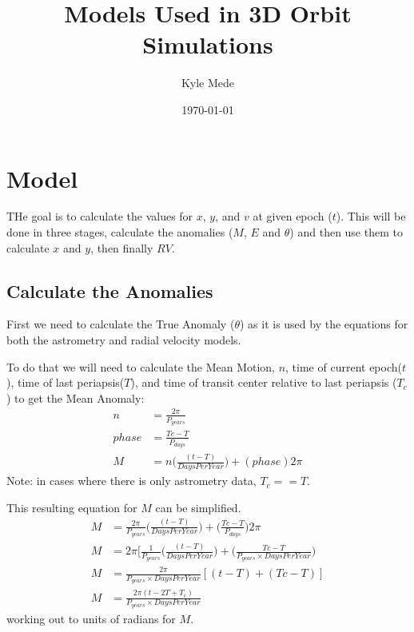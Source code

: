 \documentclass[10pt,preprint]{aastex}
\title{Models Used in 3D Orbit Simulations}
\author{Kyle Mede}
\date{\today}
\begin{document}
\maketitle

\section{Model}
THe goal is to calculate the values for $x$, $y$, and $v$ at given epoch ($t$).  This will be done in three stages, calculate the anomalies ($M$, $E$ and $\theta$) and then use them to calculate $x$ and $y$, then finally $RV$.


\subsection{Calculate the Anomalies}

First we need to calculate the True Anomaly ($\theta$) as it is used by the equations for both the astrometry and radial velocity models.

To do that we will need to calculate the Mean Motion, $n$, time of current epoch($t$), time of last periapsis($T$), and time of transit center relative to last periapsis ($T_c$) to get the Mean Anomaly:
\begin{subequations}\label{eq:n-phase-M}
\begin{align}
\label{eq:n}
n& = \frac{2\pi}{P_{years}} \\
\label{eq:phase}
phase& = \frac{Tc-T}{P_{days}} \\
\label{eq:Ma}
M& = n \bigg( \frac{(t-T)}{DaysPerYear} \bigg)+(phase)2\pi
\end{align}
\end{subequations}
Note: in cases where there is only astrometry data, $T_c==T$.

This resulting equation for $M$ can be simplified.
\begin{subequations}
\begin{align}
\label{eq:Mreduced-a}
M& = \frac{2\pi}{P_{years}} \bigg( \frac{(t-T)}{DaysPerYear}\bigg)+ \bigg(\frac{Tc-T}{P_{days}}\bigg)2\pi\\
\label{eq:Mreduced-b}
M& = 2\pi\bigg[\frac{1}{P_{years}}\bigg( \frac{(t-T)}{DaysPerYear}\bigg)+\bigg(\frac{Tc-T}{P_{years}\times DaysPerYear}\bigg)\\
\label{eq:Mreduced-c}
M& = \frac{2\pi}{P_{years}\times DaysPerYear}[(t-T)+(Tc-T)]\\
\label{eq:Mreduced-d}
M& = \frac{2\pi(t-2T+T_c)}{P_{years}\times DaysPerYear}
\end{align}
\end{subequations}
working out to units of radians for $M$.
\end{document}
